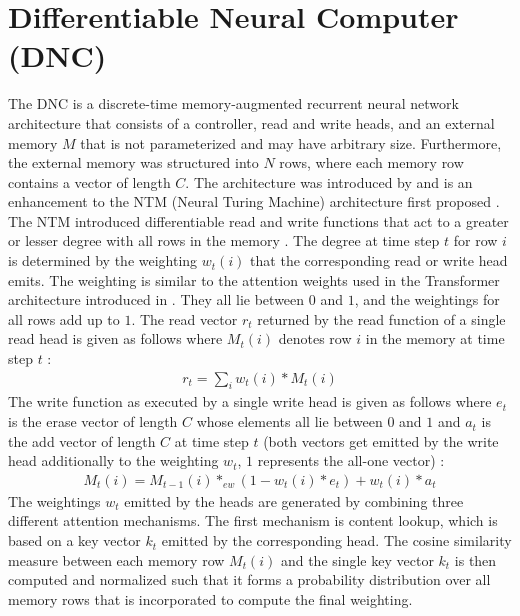 \documentclass[draft,final]{vutinfth} %
\begin{document}
    \section{Differentiable Neural Computer (DNC)} \label{dnc}
    The DNC is a discrete-time memory-augmented recurrent neural network architecture that consists of a controller, read and write heads, and an external memory $M$ that is not parameterized and may have arbitrary size.
    Furthermore, the external memory was structured into $N$ rows, where each memory row contains a vector of length $C$.
    The architecture was introduced by \cite{DNC} and is an enhancement to the NTM (Neural Turing Machine) architecture first proposed \cite{NTM}.
    The NTM introduced differentiable read and write functions that act to a greater or lesser degree with all rows in the memory \cite[p. 5]{NTM}.
    The degree at time step $t$ for row $i$ is determined by the weighting $w_t(i)$ that the corresponding read or write head emits.
    The weighting is similar to the attention weights used in the Transformer architecture introduced in \cite{Transformer}. They all lie between $0$ and $1$, and the weightings for all rows add up to $1$.
    The read vector $r_t$ returned by the read function of a single read head is given as follows where $M_t(i)$ denotes row $i$ in the memory at time step $t$ \cite[p. 1]{DNC}:
    \begin{align}
        \label{dnc_read}
        r_t = \sum_i{w_t(i) * M_t(i)}
    \end{align}
    The write function as executed by a single write head is given as follows where $e_t$ is the erase vector of length $C$ whose elements all lie between $0$ and $1$ and $a_t$ is the add vector of length $C$ at time step $t$ (both vectors get emitted by the write head additionally to the weighting $w_t$, $1$ represents the all-one vector) \cite[p. 1]{DNC}:
    \begin{align}
        \label{dnc_write}
        M_t(i) = M_{t-1}(i) *_{ew} (1 - w_t(i) * e_t) + w_t(i) * a_t
    \end{align}
    The weightings $w_t$ emitted by the heads are generated by combining three different attention mechanisms.
    The first mechanism is content lookup, which is based on a key vector $k_t$ emitted by the corresponding head.
    The cosine similarity measure between each memory row $M_t(i)$ and the single key vector $k_t$ is then computed and normalized such that it forms a probability distribution over all memory rows that is incorporated to compute the final weighting.
\end{document}
